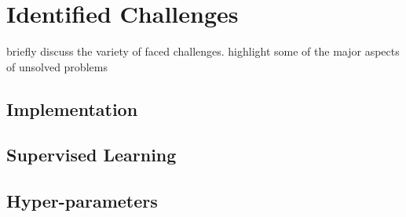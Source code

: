 \chapter{Identified Challenges}

briefly discuss the variety of faced challenges. highlight some of the major aspects of unsolved problems

\section{Implementation}

\section{Supervised Learning}

\section{Hyper-parameters}